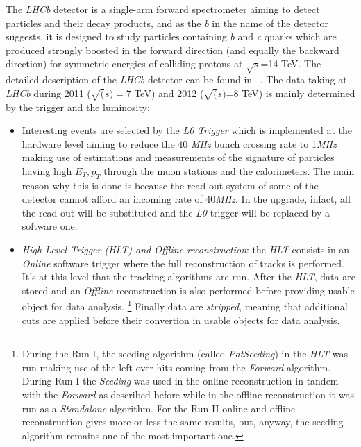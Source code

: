 \documentclass[paper=a4, fontsize=10pt]{scrartcl}
\numberwithin{equation}{section}		%
\numberwithin{figure}{section}			%
\numberwithin{table}{section}				%
\begin{document}
The \textit{LHCb} detector is a single-arm forward spectrometer aiming to detect particles and their decay products, and as the \textit{b} in the name of the detector suggests, it is designed to study particles containing \textit{b} and \textit{c} quarks which are produced strongly boosted in the forward direction (and equally the backward direction) for symmetric energies of colliding protons at $\sqrt{s}$=14 TeV.%
The detailed description of the \textit{LHCb} detector can be found in ~\cite{Blake1}.
The data taking at \textit{LHCb} during 2011 ($\sqrt(s)=$7 TeV) and 2012 ($\sqrt(s)$=8 TeV) is mainly determined by the trigger and the luminosity:
\begin{itemize}
\item{Interesting events are selected by the \textit{L0 Trigger} which is implemented at the hardware level aiming to reduce the 40 \textit{MHz} bunch crossing rate to 1\textit{MHz} making use of estimations and measurements of the signature of particles having high $E_{T},p_{T}$ through the muon stations and the calorimeters. The main reason why this is done is because the read-out system of some of the detector cannot afford an incoming rate of 40\textit{MHz}. In the upgrade, infact, all the read-out will be substituted and the \textit{L0} trigger will be replaced by a software one.}
\item{\textit{High Level Trigger (HLT) and Offline reconstruction}: the \textit{HLT} consists in an \textit{Online} software trigger where the full reconstruction of tracks is performed. It's at this level that the tracking algorithms are run. After the \textit{HLT}, data are stored and an \textit{Offline} reconstruction is also performed before providing usable object for data analysis. \footnote{During the Run-I, the seeding algorithm (called \textit{PatSeeding}) in the \textit{HLT} was run making use of the left-over hits coming from the \textit{Forward} algorithm. During Run-I the \textit{Seeding} was used in the online reconstruction in tandem with the \textit{Forward} as described before while in the offline reconstruction it was run as a \textit{Standalone} algorithm. For the Run-II online and offline reconstruction gives more or less the same results, but, anyway, the seeding algorithm remains one of the most important one.} Finally data are \textit{stripped}, meaning that additional cuts are applied before their convertion in usable objects for data analysis.}

\end{itemize}
\end{document}
